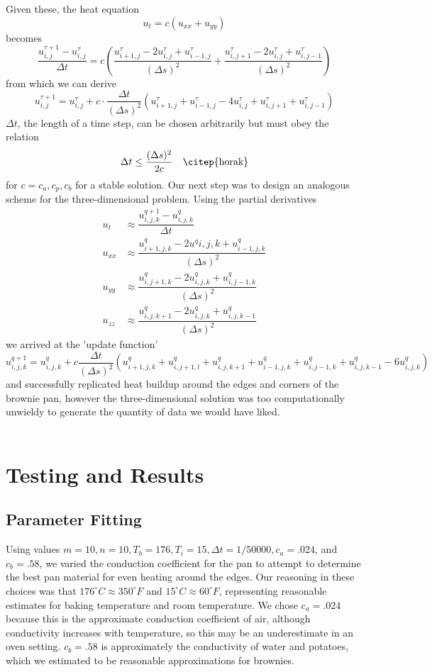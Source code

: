 \documentclass[12pt]{reedmcm}
\begin{document}
Given these, the heat equation
\[u_t = c (u_{xx} + u_{yy})\]
becomes
\[\dfrac{u_{i,j}^{\tau+1} - u_{i,j}^\tau}{\Delta t} = c  \left(\dfrac{u_{i+1,j}^\tau - 2u_{i,j}^\tau + u_{i-1,j}^\tau}{(\Delta s)^2} + \dfrac{u_{i,j+1}^\tau - 2u_{i,j}^\tau + u_{i,j-1}^\tau}{(\Delta s)^2}\right)\]
from which we can derive
\[u_{i,j}^{\tau+1} = u_{i,j}^\tau + c \cdot \frac{\Delta t}{(\Delta s)^2} \left(u_{i+1,j}^\tau + u_{i-1,j}^\tau - 4u_{i,j}^\tau + u_{i,j+1}^\tau + u_{i,j-1}^\tau \right)\]
$\Delta t$, the length of a time step, can be chosen arbitrarily but must obey the relation
\[\Delta t \leq \frac{(\Delta s)^2}{2c} \quad \text{\citep{horak}}\]
for $c = c_a,c_p,c_b$ for a stable solution.  
Our next step was to design an analogous scheme for the three-dimensional problem.  Using the partial derivatives
\begin{align*}
u_t &\approx \dfrac{u_{i,j,k}^{q+1} - u_{i,j,k}^q}{\Delta t}\\
u_{xx} &\approx \dfrac{u_{i+1,j,k}^q - 2u^q{i,j,k} + u_{i-1,j,k}^q}{(\Delta s)^2}\\
u_{yy} &\approx \dfrac{u_{i,j+1,k}^q - 2u_{i,j,k}^q + u_{i,j-1,k}^q}{(\Delta s)^2}\\
u_{zz} &\approx \dfrac{u_{i,j,k+1}^q - 2u_{i,j,k}^q + u_{i,j,k-1}^q}{(\Delta s)^2} \end{align*} 
we arrived at the 'update function'
\[u^{q+1}_{i,j,k} = u^q_{i,j,k} + c \frac{\Delta t}{(\Delta s)^2} \left(u^q_{i+1,j,k} + u^q_{i,j+1,l} + u^q_{i,j,k+1} + u^q_{i-1,j,k} + u^q_{i,j-1,k} + u^q_{i,j,k-1} - 6u^q_{i,j,k} \right)\]
and successfully replicated heat buildup around the edges and corners of the brownie pan, however the three-dimensional solution was too computationally unwieldy to generate the quantity of data we would have liked.\\
\\


\section{Testing and Results}
\subsection{Parameter Fitting}
Using values $m = 10, n=10, T_b = 176, T_i = 15, \Delta t = 1/50000, c_a = .024$, and $c_b = .58$, we varied the conduction coefficient for the pan to attempt to determine the best pan material for even heating around the edges.  Our reasoning in these choices was that $176^\circ C \approx 350^\circ F$ and $15^\circ C \approx 60^\circ F$, representing reasonable estimates for baking temperature and room temperature.  We chose $c_a = .024$ because this is the approximate conduction coefficient of air, although conductivity increases with temperature, so this may be an underestimate in an oven setting.  $c_b = .58$ is approximately the conductivity of water and potatoes, which we estimated to be reasonable approximations for brownies.\\
\end{document}
